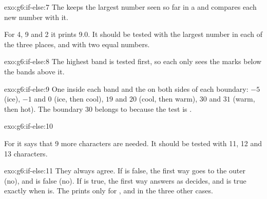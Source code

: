 \begin{solution}{exo:g6:if-else:7}
The  keeps the largest number seen so far in a  and compares
each new number with it.

\label{lst:g6:if-else:sol-largest}

For 4, 9 and 2 it prints 9.0. It should be tested with the largest number in
each of the three places, and with two equal numbers.
\end{solution}

\begin{solution}{exo:g6:if-else:8}
The highest band is tested first, so each  only sees the marks below
the bands above it.

\label{lst:g6:if-else:sol-grade}
\end{solution}

\begin{solution}{exo:g6:if-else:9}
One  inside each band and the  on both sides of each boundary: $-5$
(ice), $-1$ and $0$ (ice, then cool), $19$ and $20$ (cool, then warm), $30$ and
$31$ (warm, then hot). The boundary 30 belongs to  because the test is
\code{<=}.
\end{solution}

\begin{solution}{exo:g6:if-else:10}
\label{lst:g6:if-else:sol-password}

For  it says that 9 more characters are needed. It should be tested
with 11, 12 and 13 characters.
\end{solution}

\begin{solution}{exo:g6:if-else:11}
They always agree. If  is false, the first way goes to the outer
 (no), and  is false (no). If  is true, the
first way answers as  decides, and  is true exactly when
 is. The  prints  only for , and
 in the three other cases.
\end{solution}

